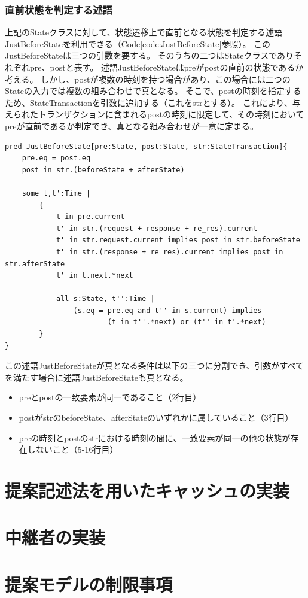 \documentclass[12pt,a4paper]{jbook}
\begin{document}
\subsubsection{直前状態を判定する述語}
上記のStateクラスに対して、状態遷移上で直前となる状態を判定する述語JustBeforeStateを利用できる（Code\ref{code:JustBeforeState}参照）。
このJustBeforeStateは三つの引数を要する。
そのうちの二つはStateクラスでありそれぞれpre、postと表す。
述語JustBeforeStateはpreがpostの直前の状態であるか考える。
しかし、postが複数の時刻を持つ場合があり、この場合には二つのStateの入力では複数の組み合わせで真となる。
そこで、postの時刻を指定するため、StateTransactionを引数に追加する（これをstrとする）。
これにより、与えられたトランザクションに含まれるpostの時刻に限定して、その時刻においてpreが直前であるか判定でき、真となる組み合わせが一意に定まる。
\begin{lstlisting}[caption=状態遷移において直前の状態を判定する述語, label=code:JustBeforeState]
pred JustBeforeState[pre:State, post:State, str:StateTransaction]{
	pre.eq = post.eq
	post in str.(beforeState + afterState)

	some t,t':Time |
		{
			t in pre.current
			t' in str.(request + response + re_res).current
			t' in str.request.current implies post in str.beforeState
			t' in str.(response + re_res).current implies post in str.afterState
			t' in t.next.*next

			all s:State, t'':Time |
				(s.eq = pre.eq and t'' in s.current) implies
						(t in t''.*next) or (t'' in t'.*next)
		}
}
\end{lstlisting}
この述語JustBeforeStateが真となる条件は以下の三つに分割でき、引数がすべてを満たす場合に述語JustBeforeStateも真となる。
\begin{itemize}
\item preとpostの一致要素が同一であること（2行目）
\item postがstrのbeforeState、afterStateのいずれかに属していること（3行目）
\item preの時刻とpostのstrにおける時刻の間に、一致要素が同一の他の状態が存在しないこと（5-16行目）
\end{itemize}



\section{提案記述法を用いたキャッシュの実装}
\section{中継者の実装}
\color{black}
\section{提案モデルの制限事項}
\end{document}
